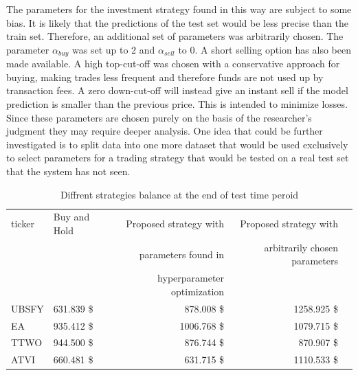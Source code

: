 \documentclass[11pt]{article} %
\begin{document}
The parameters for the investment strategy found in this way are subject to some bias. It is likely that the predictions of the test set would be less precise than the train set. Therefore, an additional set of parameters was arbitrarily chosen. The parameter $\alpha_{buy}$  was set up to 2 and $\alpha_{sell}$  to 0. A short selling option has also been made available.  A high top-cut-off was chosen with a conservative approach for buying, making trades less frequent and therefore funds are not used up by transaction fees. A zero down-cut-off will instead give an instant sell if the model prediction is smaller than the previous price. This is intended to minimize losses. Since these parameters are chosen purely on the basis of the researcher's judgment they may require deeper analysis. One idea that could be further investigated is to split data into one more dataset that would be used exclusively to select parameters for a trading strategy that would be tested on a real test set that the system has not seen. 

\begin{table}[H]
\centering
\caption{Diffrent strategies balance at the end of test time peroid}
\begin{tabular}{llrrr}
\toprule
 ticker &  Buy and Hold &  Proposed strategy with  &  Proposed strategy with  \\
  &        &                                        parameters found in  &                                           arbitrarily chosen parameters \\
  &        &                                         hyperparameter optimization &                                            \\

 \midrule
  UBSFY &       631.839 \$&                                            878.008 \$ &                                           1258.925 \$\\
    EA &       935.412 \$&                                           1006.768 \$&                                           1079.715 \$\\
   TTWO &       944.500 \$&                                            876.744 \$&                                            870.907 \$\\
   ATVI &       660.481 \$&                                            631.715 \$&                                           1110.533 \$\\
\bottomrule
\end{tabular}
\end{table}
\end{document}
